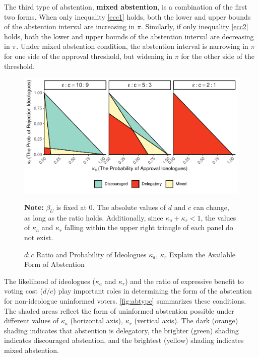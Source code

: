 \documentclass[letterpaper, 12pt]{article}
\newcommand{\floatnote}[1]{\vspace{\abovecaptionskip}\caption*{\textbf{Note:} #1}\vspace{-\abovecaptionskip}}
\begin{document}
    \par The third type of abstention, \textbf{mixed abstention}, is a combination of the first two forms. When only inequality \ref{ecc1} holds, both the lower and upper bounds of the abstention interval are increasing in $\pi$. Similarly, if only inequality \ref{ecc2} holds, both the lower and upper bounds of the abstention interval are decreasing in $\pi$. Under mixed abstention condition, the abstention interval is narrowing in $\pi$ for one side of the approval threshold, but widening in $\pi$ for the other side of the threshold.  
        
    \begin{figure}[t!]
        \caption{$d:c$ Ratio and Probability of Ideologues $\kappa_a$, $\kappa_r$ Explain the Available Form of Abstention}
        \label{fig:abtype}
        \includegraphics[width=\linewidth]{figure/abtype-1}
        \floatnote{$\beta_U$ is fixed at $0$. The absolute values of $d$ and $c$ can change, as long as the ratio holds. Additionally, since $\kappa_a + \kappa_r < 1$, the values of $\kappa_a$ and $\kappa_r$ falling within the upper right triangle of each panel do not exist.}
    \end{figure}
    
    \par The likelihood of ideologues ($\kappa_{a}$ and $\kappa_{r}$) and the ratio of expressive benefit to voting cost ($d/c$) play important roles in determining the form of the abstention for non-ideologue uninformed voters. \autoref{fig:abtype} summarizes these conditions. The shaded areas reflect the form of uninformed abstention possible under different values of $\kappa_a$ (horizontal axis), $\kappa_r$ (vertical axis). The dark (orange) shading indicates that abstention is delegatory, the brighter (green) shading indicates discouraged abstention, and the brightest (yellow) shading indicates mixed abstention. 
    
\end{document}
